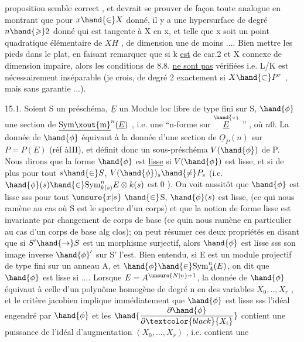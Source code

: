 
proposition semble correct , et devrait se prouver de façon toute analogue
en montrant que pour $x\hand{\in} X$ donné, il y a une hypersurface  de degré $n\hand{\geqslant} 2$
donné qui est tangente à X en x, et telle que x soit un point quadratique
élémentaire de $X$\hand{$\cap$}$H$ , de dimension une de moins .... Bien mettre les
pieds dans le plat, en faisant remarquer que si k \uline{est} de car.2 et X
connexe  de dimension impaire, alors les conditions de 8.8. \uline{ne sont pas}
vérifiées i.e. L/K est nécessairement inséparable (je crois, de degré
2 exactement si $X\hand{\subset} P^r$ , mais sans garantie ...).

15.1. Soient S un préschéma, $\underline{E}$ un Module loc libre de type fini
sur S, $\hand{\phi}$ une section de $\underline{\mathrm{Sym\xout{m}}}^n(\underline{E})$ , i.e. une ``n-forme sur $\overset{\hand{\scriptscriptstyle\vee}}{\underline{E}}$ '' , où $n$\over{$>$}{\unsure{$\geqslant$}}$0$.
La donnée de $\hand{\phi}$ équivaut à la donnée d'une section de $\underline{O}_P(n)$ sur $P=P(\underline{E})$
(réf àIII), et définit donc un sous-préschéma $V(\hand{\phi})$ de P. Nous dirons que
la forme $\hand{\phi}$ est \uline{lisse} si $V(\hand{\phi})$ est lisse, et si de plus pour tout $s\hand{\in} S$,
$V(\hand{\phi})_s\hand{\neq} P_s$ (i.e. $\hand{\phi}(s)\hand{\in} \mathrm{Sym}^n_{k(s)}E\otimes k(s)$ est \over{\unsure{$=$}}{$\neq$}\hand{\unsure{(}}$0$ ). On voit aussitôt
que $\hand{\phi}$ est lisse sss pour tout $\unsure{x|s}$ $\hand{\in}$S, $\hand{\phi}(s)$ est lisse, 
(ce qui nous ramène au cas où S est le spectre d'un corps) et
que la notion de forme lisse est invariante par changement de corps de
base (ce quin nous ramène en particulier au cas d'un corps de base alg
clos); on peut résumer ces deux propriétés en disant que si $S'\hand{\to} S$ est
un morphisme surjectif, alors $\hand{\phi}$ est lisse sss son image inverse $\hand{\phi}'$ sur S'
l'est. Bien entendu, si E est un module projectif de type fini sur un
anneau A, et $\hand{\phi}\hand{\in}\mathrm{Sym}^n_A(E)$, on dit que $\hand{\phi}$ est lisse si .... Lorsque $E=A^{\unsure{N|n}+1}$,
la donnée de $\hand{\phi}$ équivaut à celle d'un polynôme homogène de degré n
en des variables $X_0,..,X_r$ , et le critère jacobien implique immédiatement
que  $\hand{\phi}$ est lisse sss l'idéal engendré par $\hand{\phi}$ et les $\hand{\dfrac{\partial\hand{\phi}}{\partial\textcolor{black}{X_i}}}$ contient
une puissance de l'idéal d'augmentation $(X_0,\dots,X_r)$ , i.e. contient une

 
